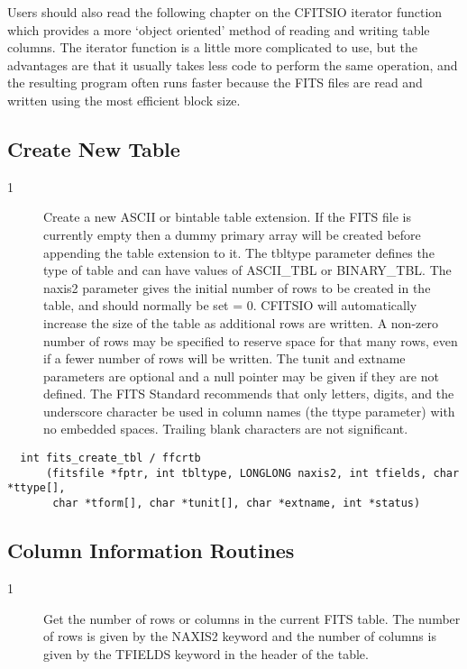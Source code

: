 \documentclass[11pt]{book}
\begin{document}
Users should also read the following chapter on the CFITSIO iterator
function which provides a more `object oriented' method of reading and
writing table columns.  The iterator function is a little more
complicated to use, but the advantages are that it usually takes less
code to perform the same operation, and the resulting program often
runs faster because the FITS files are read and written using the most
efficient block size.


\subsection{Create New Table}


\begin{description}
\item[1 ]Create a new ASCII or bintable table extension. If
   the FITS file is currently empty then a dummy primary array will be
   created before appending the table extension to it.  The tbltype
   parameter defines the type of table and can have values of
   ASCII\_TBL or BINARY\_TBL.  The naxis2 parameter gives the initial
   number of rows to be created in the table, and should normally be
   set = 0.  CFITSIO will automatically increase the size of the table
   as additional rows are written.  A non-zero number of rows may be
   specified to reserve space for that many rows, even if a fewer
   number of rows will be written.  The tunit and extname parameters
   are optional and a null pointer may be given if they are not
   defined.  The FITS Standard recommends that only letters, digits,
   and the underscore character be used in column names (the ttype
   parameter) with no embedded spaces.  Trailing blank characters are
   not significant.   \label{ffcrtb}
\end{description}

\begin{verbatim}
  int fits_create_tbl / ffcrtb
      (fitsfile *fptr, int tbltype, LONGLONG naxis2, int tfields, char *ttype[],
       char *tform[], char *tunit[], char *extname, int *status)
\end{verbatim}

\subsection{Column Information Routines}


\begin{description}
\item[1 ]  Get the number of rows or columns in the current FITS table.
     The number of rows is given by the NAXIS2 keyword and the
     number of columns is given by the TFIELDS keyword in the header
    of the table. \label{ffgnrw}
\end{description}
\end{document}

